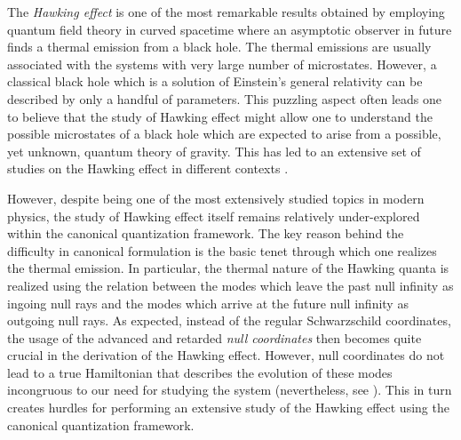 \documentclass[aps,twocolumn,showpacs]{revtex4}
\begin{document}
The \emph{Hawking effect} \cite{hawking1975} is one of the most remarkable 
results obtained by employing quantum field theory in curved spacetime 
\cite{book:Birrell,book:Parker,book:Mukhanov} where an asymptotic observer in 
future finds a thermal emission from a black hole. The thermal emissions are 
usually associated with the systems with very large number of microstates. 
However, a classical black hole which is a solution of Einstein's  general 
relativity \cite{book:Schutz,book:carroll,book:wald,Fulling:1989nb} 
can be described by only a handful of parameters. This puzzling aspect often 
leads one to believe that the study of Hawking effect might allow one to 
understand the possible microstates of a black hole which are expected to arise 
from a possible, yet unknown, quantum theory of gravity. This has led to an 
extensive set of studies on the Hawking effect in different contexts 
\cite{Lambert:2013uaa, Jacobson:2003vx, Kiefer:2002fp, Traschen:1999zr, 
DEWITT1975295, Ford:1997hb, Hollands:2014eia,Padmanabhan:2009vy, 
Chakraborty:2015nwa,Chakraborty:2017pmn,Helfer:2003va,Carlip:2014pma,
Fulling1987135,Hinton:1982, Parikh:1999mf,Visser:2001kq, 
Singleton:2011vh,Bhattacharya:2013tq, Singh:2013pxf,Lapedes:1977ip, 
Davies:1974th, Wald1975,Singh:2014paa,Dray1985,Kawai:2013mda, 
Ho:2015fja,Jacobson:2012ei,PhysRevD.46.2486,Hartle:1976tp}.



However, despite being one of the most extensively studied topics in modern 
physics, the study of Hawking effect itself remains relatively under-explored 
within the canonical quantization framework. The key reason behind the
difficulty in canonical formulation is the basic tenet through which one 
realizes the thermal emission. In particular, the thermal nature of the Hawking 
quanta is realized using the relation between the modes which leave the past 
null infinity as ingoing null rays and the modes which arrive at the future 
null infinity as outgoing null rays. As expected, instead of the regular 
Schwarzschild coordinates, the usage of the advanced and retarded \emph{null 
coordinates} then becomes quite crucial in the derivation of the Hawking effect. 
However, null coordinates do not lead to a true Hamiltonian that describes the 
evolution of these modes incongruous to our need for studying the system 
(nevertheless, see 
\cite{Torre:1985rw,Dirac:1949cp,Harindranath:1996hq,dInverno:2006wzl}).
This in turn creates hurdles for performing an extensive study of the Hawking 
effect using the canonical quantization framework.
\end{document}
